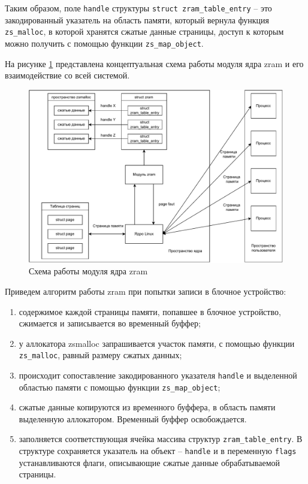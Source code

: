 \documentclass[12pt, a4paper]{article}
\begin{document}
Таким образом, поле \texttt{handle} структуры \texttt{struct zram\_table\_entry} -- это закодированный указатель на область памяти, который вернула функция \texttt{zs\_malloc}, в которой хранятся сжатые данные страницы, доступ к которым можно получить с помощью функции \texttt{zs\_map\_object}.

На рисунке \ref{fig:zram} представлена концептуальная схема работы модуля ядра zram и его взаимодействие со всей системой.

\begin{figure}[h]
	\centering
	\includegraphics[width=\textwidth]{img/zram-arch.pdf}
	\caption{Схема работы модуля ядра zram}
	\label{fig:zram}
\end{figure}

Приведем алгоритм работы zram при попытки записи в блочное устройство:

\begin{enumerate}
	\item содержимое каждой страницы памяти, попавшее в блочное устройство, сжимается и записывается во временный буффер;
	\item у аллокатора zsmalloc запрашивается участок памяти, с помощью функции \texttt{zs\_malloc}, равный размеру сжатых данных;
	\item происходит сопоставление закодированного указателя \texttt{handle} и выделенной областью памяти с помощью функции \texttt{zs\_map\_object};
	\item сжатые данные копируются из временного буффера, в область памяти выделенную аллокатором. Временный буффер освобождается.
	\item заполняется соответствующая ячейка массива структур \texttt{zram\_table\_entry}. В структуре сохраняется указатель на объект --  \texttt{handle} и в переменную \texttt{flags} устанавливаются флаги, описывающие сжатые данные обрабатываемой страницы. 
\end{enumerate}
\end{document}
